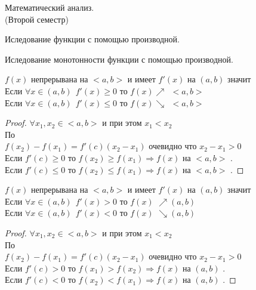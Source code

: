 \begin{title}
  Математический анализ.\\
  (Второй семестр)
\end{title}

\begin{title}
  Иследование функции с помощью производной.
\end{title}

\begin{title}[\Large]
  Иследование монотонности функции с помощью производной.
\end{title}

\begin{theorem}
  $f(x)$ непрерывана на $<a,b>$ и имеет $f'(x)$ на $(a,b)$ значит
  \\
  Если $\forall x \in (a,b) ~~ f'(x) \ge 0 $ то $f(x) \nearrow ~~ <a,b>$\\
  Если $\forall x \in (a,b) ~~ f'(x) \le 0 $ то $f(x) \searrow ~~ <a,b>$
\end{theorem}

\begin{proof}
  $\forall x_1, x_2 \in <a,b>$ и при этом $x_1 < x_2 $\\
  По \\
  $f(x_2) - f(x_1) = f'(c)(x_2 - x_1)$ очевидно что $x_2 - x_1 > 0 $\\
  Если $f'(c) \ge 0$ то $f(x_2) \ge f(x_1) \Rightarrow f(x)$ на $<a,b>$
  .\\
  Если $f'(c) \le 0$ то $f(x_2) \le f(x_1) \Rightarrow f(x)$ на $<a,b>$
  .
\end{proof}

\begin{theorem}
  $f(x)$ непрерывана на $<a,b>$ и имеет $f'(x)$ на $(a,b)$ значит\\
  Если $\forall x \in (a, b) ~~ f'(x) > 0$ то $f(x)$ 
  $\nearrow (a, b)$\\
  Если $\forall x \in (a, b) ~~ f'(x) < 0$ то $f(x)$ 
  $\searrow (a, b)$
\end{theorem}

\begin{proof}
  $\forall x_1, x_2 \in <a,b>$ и при этом $x_1 < x_2 $\\
  По \\
  $f(x_2) - f(x_1) = f'(c)(x_2 - x_1)$ очевидно что $x_2 - x_1 > 0$\\
  Если $f'(c) > 0$ то $f(x_1) > f(x_2) \Rightarrow f(x)$ на $(a,b)$
  .\\
  Если $f'(c) < 0$ то $f(x_2) < f(x_1) \Rightarrow f(x)$ на $(a,b)$
  .
\end{proof}

